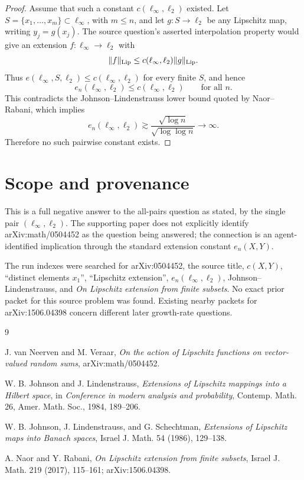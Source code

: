 \documentclass[11pt]{amsart}
\begin{document}
\begin{proof}
Assume that such a constant \(c(\ell_\infty,\ell_2)\) existed. Let
\(S=\{x_1,\ldots,x_m\}\subset \ell_\infty\), with \(m\le n\), and let
\(g:S\to\ell_2\) be any Lipschitz map, writing \(y_j=g(x_j)\). The source
question's asserted interpolation property would give an extension
\(f:\ell_\infty\to\ell_2\) with
\[
  \|f\|_{\rm Lip}\le c(\ell_\infty,\ell_2)\|g\|_{\rm Lip}.
\]
Thus \(e(\ell_\infty,S,\ell_2)\le c(\ell_\infty,\ell_2)\) for every finite
\(S\), and hence
\[
  e_n(\ell_\infty,\ell_2)\le c(\ell_\infty,\ell_2)
  \qquad \text{for all }n.
\]
This contradicts the Johnson--Lindenstrauss lower bound quoted by
Naor--Rabani, which implies
\[
  e_n(\ell_\infty,\ell_2)\gtrsim
  \frac{\sqrt{\log n}}{\sqrt{\log\log n}}\to\infty.
\]
Therefore no such pairwise constant exists.
\end{proof}

\section*{Scope and provenance}

This is a full negative answer to the all-pairs question as stated, by the
single pair \((\ell_\infty,\ell_2)\). The supporting paper does not explicitly
identify arXiv:math/0504452 as the question being answered; the connection is
an agent-identified implication through the standard extension constant
\(e_n(X,Y)\).

The run indexes were searched for arXiv:0504452, the source title,
\(c(X,Y)\), ``distinct elements \(x_1\)'', ``Lipschitz extension'',
\(e_n(\ell_\infty,\ell_2)\), Johnson--Lindenstrauss, and
\emph{On Lipschitz extension from finite subsets}. No exact prior packet for
this source problem was found. Existing nearby packets for arXiv:1506.04398
concern different later growth-rate questions.

\begin{thebibliography}{9}

J. van Neerven and M. Veraar,
\emph{On the action of Lipschitz functions on vector-valued random sums},
arXiv:math/0504452.

W. B. Johnson and J. Lindenstrauss,
\emph{Extensions of Lipschitz mappings into a Hilbert space},
in \emph{Conference in modern analysis and probability}, Contemp. Math. 26,
Amer. Math. Soc., 1984, 189--206.

W. B. Johnson, J. Lindenstrauss, and G. Schechtman,
\emph{Extensions of Lipschitz maps into Banach spaces},
Israel J. Math. 54 (1986), 129--138.

A. Naor and Y. Rabani,
\emph{On Lipschitz extension from finite subsets},
Israel J. Math. 219 (2017), 115--161; arXiv:1506.04398.

\end{thebibliography}
\end{document}
